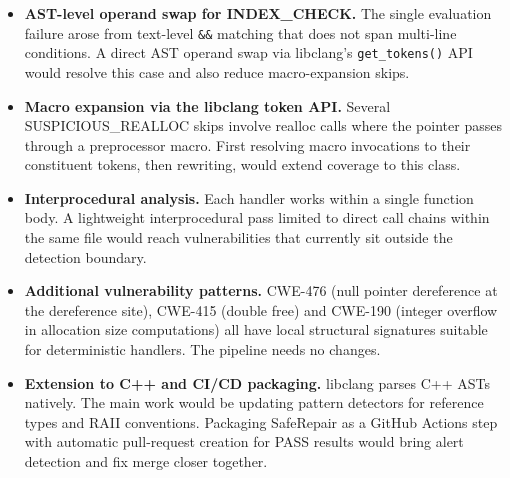 \begin{itemize}

  \item \textbf{AST-level operand swap for INDEX\_CHECK.} The single evaluation failure arose from text-level \texttt{\&\&} matching that does not span multi-line conditions. A direct AST operand swap via libclang's \texttt{get\_tokens()} API would resolve this case and also reduce macro-expansion skips.

  \item \textbf{Macro expansion via the libclang token API.} Several SUSPICIOUS\_REALLOC skips involve realloc calls where the pointer passes through a preprocessor macro. First resolving macro invocations to their constituent tokens, then rewriting, would extend coverage to this class.

  \item \textbf{Interprocedural analysis.} Each handler works within a single function body. A lightweight interprocedural pass limited to direct call chains within the same file would reach vulnerabilities that currently sit outside the detection boundary.

  \item \textbf{Additional vulnerability patterns.} CWE-476 (null pointer dereference at the dereference site), CWE-415 (double free) and CWE-190 (integer overflow in allocation size computations) all have local structural signatures suitable for deterministic handlers. The pipeline needs no changes.

  \item \textbf{Extension to C++ and CI/CD packaging.} libclang parses C++ ASTs natively. The main work would be updating pattern detectors for reference types and RAII conventions. Packaging SafeRepair as a GitHub Actions step with automatic pull-request creation for PASS results would bring alert detection and fix merge closer together.

\end{itemize}
